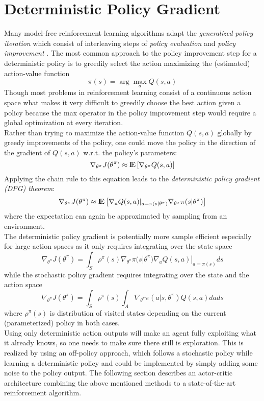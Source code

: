 \section{Deterministic Policy Gradient}
\label{sec:DPG}
Many model-free reinforcement learning algorithms adapt the \textit{generalized policy iteration} which consist of interleaving steps of \textit{policy evaluation} and \textit{policy improvement} \citep{sutton2018reinforcement}. The most common approach to the policy improvement step for a deterministic policy is to greedily select the action maximizing the (estimated) action-value function
\[
\pi(s) = \arg\max_a Q(s, a)
\]
Though most problems in reinforcement learning consist of a continuous action space what makes it very difficult to greedily choose the best action given a policy because the max operator in the policy improvement step would require a global optimization at every iteration.\\ 
Rather than trying to maximize the action-value function $Q(s,a)$ globally by greedy improvements of the policy, one could move the policy in the direction of the gradient of $Q(s,a)$ w.r.t. the policy's parameters:
\[
\nabla_{\theta^\pi}J(\theta^\pi)\approx {\rm I\!E}\left[\nabla_{\theta^\pi}Q(s,a)\right]
\]
Applying the chain rule to this equation leads to the \textit{deterministic policy gradient (DPG) theorem}:
\begin{align*}
\nabla_{\theta^\pi}J(\theta^\pi)\approx {\rm I\!E}\left[\nabla_aQ(s,a)|_{a=\pi(s|\theta^\pi)} \nabla_{\theta^\pi}\pi(s|\theta^\pi)\right]
\end{align*}
where the expectation can again be approximated by sampling from an environment.\\
The deterministic policy gradient is potentially more sample efficient especially for large action spaces as it only requires integrating over the state space
\[
\nabla_{\theta^\pi}J(\theta^\pi) = \int_{\mathit{S}}\rho^\pi(s) \nabla_{\theta^\pi}\pi(s|\theta^\pi)\nabla_a Q(s,a)|_{a=\pi(s)} ds
\]
while the stochastic policy gradient \citep{sutton2018reinforcement} requires integrating over the state and the action space
\[
\nabla_{\theta^\pi}J(\theta^\pi)=\int_{\mathit{S}}\rho^\pi(s)\int_{\mathit{A}}\nabla_{\theta^\pi}\pi(a|s,\theta^\pi)Q(s, a) da ds
\]
where $\rho^\pi(s)$ is distribution of visited states depending on the current (parameterized) policy in both cases.\\
Using only deterministic action outputs will make an agent fully exploiting what it already knows, so one needs to make sure there still is exploration. This is realized by using an off-policy approach, which follows a stochastic policy while learning a deterministic policy and could be implemented by simply adding some noise to the policy output. The following section describes an actor-critic architecture combining the above mentioned methods to a state-of-the-art reinforcement algorithm.



